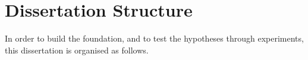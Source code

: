 %
\section{Dissertation Structure}
\label{sec:dissertation-structure}

In order to build the foundation, and to test the hypotheses through experiments, this dissertation is organised as follows.


